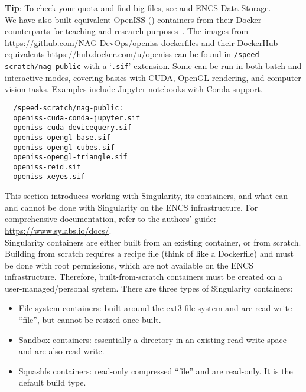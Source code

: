 \noindent \textbf{Tip}: To check your quota and find big files, 
see  and
\href{https://www.concordia.ca/ginacody/aits/encs-data-storage.html}{ENCS Data Storage}.\\

We have also built equivalent OpenISS () containers from their Docker 
counterparts for teaching and research purposes~\cite{oi-containers-poster-siggraph2023}. 
The images from \url{https://github.com/NAG-DevOps/openiss-dockerfiles}
and their DockerHub equivalents \url{https://hub.docker.com/u/openiss} can be found in 
\verb+/speed-scratch/nag-public+ with a `\texttt{.sif}' extension.
Some can be run in both batch and interactive modes, covering basics with CUDA, OpenGL rendering, 
and computer vision tasks. Examples include Jupyter notebooks with Conda support.

\begin{verbatim}
  /speed-scratch/nag-public:
  openiss-cuda-conda-jupyter.sif
  openiss-cuda-devicequery.sif
  openiss-opengl-base.sif
  openiss-opengl-cubes.sif
  openiss-opengl-triangle.sif
  openiss-reid.sif
  openiss-xeyes.sif
\end{verbatim}

This section introduces working with Singularity, its containers, and what can and cannot 
be done with Singularity on the ENCS infrastructure. For comprehensive documentation, 
refer to the authors' guide: \url{https://www.sylabs.io/docs/}.\\

Singularity containers are either built from an existing container, or from scratch. 
Building from scratch requires a recipe file (think of like a Dockerfile) and
must be done with root permissions, which are not available on the ENCS infrastructure. 
Therefore, built-from-scratch containers must be created on a user-managed/personal system. 
There are three types of Singularity containers:

\begin{itemize}
  \item File-system containers: built around the ext3 file system and are read-write ``file'', but cannot be resized once built.
  \item Sandbox containers: essentially a directory in an existing read-write space and are also read-write.
  \item Squashfs containers: read-only compressed ``file'' and are read-only. It is the default build type.
\end{itemize}

